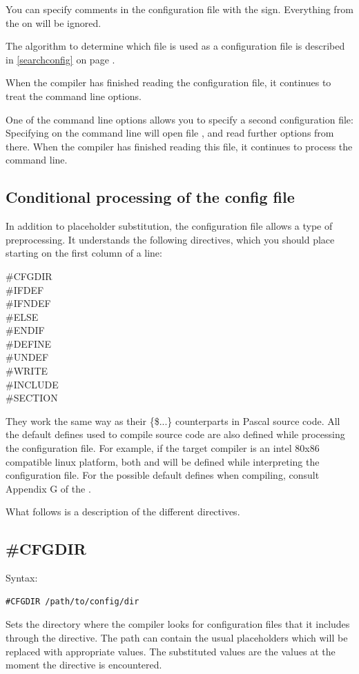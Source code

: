 You can specify comments in the configuration file with the \var{\#} sign.
Everything from the \var{\#} on will be ignored.

The algorithm to determine which file is used as a configuration file
is described in \ref{searchconfig} on page \pageref{searchconfig}.

When the compiler has finished reading the configuration file, it continues
to treat the command line options.

One of the command line options allows you to specify a second configuration
file: Specifying  on the command line will open file ,
and read further options from there. When the compiler has finished reading
this file, it continues to process the command line.

\subsection{Conditional processing of the config file}
In addition to placeholder substitution, the configuration file allows a type of preprocessing.
It understands the following directives, which you should place starting on the first column of a line:
\begin{description}
\item [\#CFGDIR]
\item [\#IFDEF]
\item [\#IFNDEF]
\item [\#ELSE]
\item [\#ENDIF]
\item [\#DEFINE]
\item [\#UNDEF]
\item [\#WRITE]
\item [\#INCLUDE]
\item [\#SECTION]
\end{description}
They work the same way as their \{\$...\}  counterparts in Pascal source code.
All the default defines used to compile source code are also defined while
processing the configuration file. For example, if the target compiler is an
intel 80x86 compatible linux platform, both  and  will be
defined while interpreting the configuration file. For the possible default
defines when compiling, consult Appendix G of the \progref.

What follows is a description of the different directives.

\subsection{\#CFGDIR}
Syntax:
\begin{verbatim}
#CFGDIR /path/to/config/dir
\end{verbatim}
Sets the directory where the compiler looks for configuration files that it
includes through the  directive.  The path can contain the
usual placeholders which will be replaced with appropriate values.
The substituted values are the values at the moment the  directive is
encountered.

